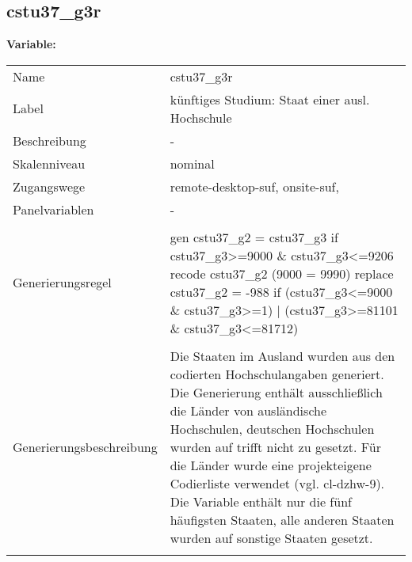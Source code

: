 	
	
	\subsection{cstu37\_g3r}
	\label{subSection:cstu37_g3r}

	\noindent\textbf{Variable:}\\
		\begin{tabular}{lL{11.3cm}}
			\label{tableVariable:cstu37_g3r}
			Name & cstu37\_g3r \\
			Label & künftiges Studium: Staat einer ausl. Hochschule \\
			Beschreibung & - \\
			Skalenniveau & nominal \\
			Zugangswege &
				remote-desktop-suf,
				onsite-suf,
 \\
			Panelvariablen & -
			 \\
			 \\
					Generierungsregel & gen cstu37\_g2 = cstu37\_g3 if cstu37\_g3\textgreater{}=9000 \& cstu37\_g3\textless{}=9206
recode cstu37\_g2 (9000 = 9990)
replace cstu37\_g2 = -988 if (cstu37\_g3\textless{}=9000 \& cstu37\_g3\textgreater{}=1) | (cstu37\_g3\textgreater{}=81101 \& cstu37\_g3\textless{}=81712) \\
				 \\
					Generierungsbeschreibung & Die Staaten im Ausland wurden aus den codierten Hochschulangaben generiert. Die Generierung enthält ausschließlich die Länder von ausländische Hochschulen, deutschen Hochschulen wurden auf trifft nicht zu gesetzt. Für die Länder wurde eine projekteigene Codierliste verwendet (vgl. cl-dzhw-9). Die Variable enthält nur die fünf häufigsten Staaten, alle anderen Staaten wurden auf sonstige Staaten gesetzt. 
				 \\	
			 \\
		\end{tabular}






